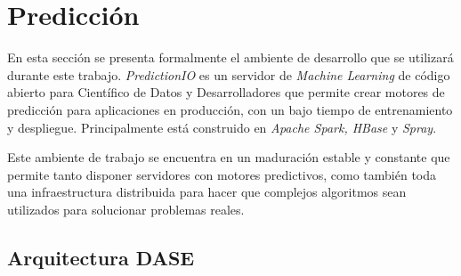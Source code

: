 

\section{Predicción }

  	
En esta sección se presenta formalmente el ambiente de desarrollo que se utilizará durante este trabajo. \emph{PredictionIO} es un servidor de \emph{Machine Learning} de código abierto para Científico de Datos y Desarrolladores que permite crear motores de predicción para aplicaciones en producción, con un bajo tiempo de entrenamiento y despliegue. Principalmente está construido en \emph{Apache Spark, HBase} y \emph{Spray}. 

Este ambiente de trabajo se encuentra en un maduración estable y constante que permite tanto disponer servidores con motores predictivos, como también toda una infraestructura distribuida para hacer que complejos algoritmos sean utilizados para solucionar problemas reales.














 
 



\subsection{Arquitectura DASE}


